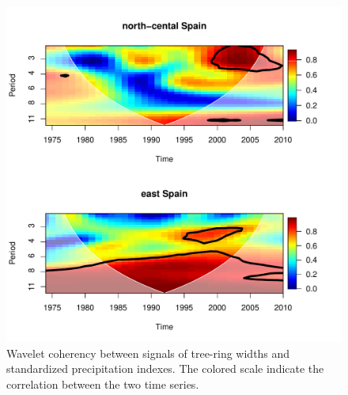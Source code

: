 \documentclass[review,authoryear]{elsarticle}
\begin{document}
\clearpage
\begin{figure}\centering
\includegraphics[scale=0.7,trim=20mm 0mm 20mm 0mm]{coherence1}
\caption{Wavelet coherency between signals of tree-ring widths and
  standardized precipitation indexes. The colored scale indicate the
  correlation between the two time series.}
\label{fig:cohe}
\end{figure}


\end{document}
